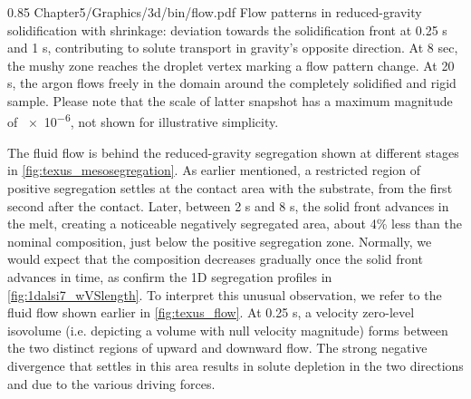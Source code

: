 \begin{figureth}
{0.85}
{Chapter5/Graphics/3d/bin/flow.pdf}
{Flow patterns in reduced-gravity solidification with shrinkage: 
deviation towards the solidification front at 0.25 s and 1 s, contributing to solute transport in gravity's opposite direction.
At 8 sec, the mushy zone reaches the droplet vertex marking a flow pattern change. 
At 20 s, the argon flows freely in the domain around the completely solidified and rigid sample.
Please note that the scale of latter snapshot has a maximum magnitude of \SI{e-6}{\uvelocity}, not shown
for illustrative simplicity.}
\label{fig:texus_flow}
\end{figureth}

The fluid flow is behind the reduced-gravity segregation shown at different stages in \cref{fig:texus_mesosegregation}.
As earlier mentioned, a restricted region of positive segregation settles at the contact area with the substrate,
from the first second after the contact. Later, between 2 s and 8 s, the solid front advances in the melt, creating 
a noticeable negatively segregated area, about 4\% less than the nominal composition, just below the positive segregation zone.
Normally, we would expect that the composition decreases gradually once the solid front advances in time, as confirm the 1D segregation
profiles in \cref{fig:1dalsi7_wVSlength}. To interpret this unusual observation, we refer to the fluid flow shown earlier in \cref{fig:texus_flow}.
At 0.25 s, a velocity zero-level isovolume (i.e. depicting a volume with null velocity magnitude) forms between the two distinct regions
of upward and downward flow. The strong negative divergence that settles in this area results in solute depletion in the two directions
and due to the various driving forces. 

